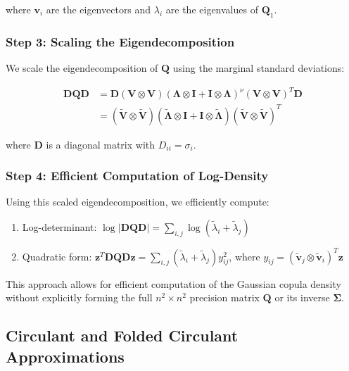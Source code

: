 \documentclass[journal=,manuscript=]{achemso}
\begin{document}
where \(\mathbf{v}_i\) are the eigenvectors and \(\lambda_i\) are the
eigenvalues of \(\mathbf{Q}_1\).

\subsubsection{Step 3: Scaling the
Eigendecomposition}\label{step-3-scaling-the-eigendecomposition}

We scale the eigendecomposition of \(\mathbf{Q}\) using the marginal
standard deviations:

\[
\begin{aligned}
\mathbf{D}\mathbf{Q}\mathbf{D} &= \mathbf{D}(\mathbf{V} \otimes \mathbf{V})(\mathbf{\Lambda} \otimes \mathbf{I} + \mathbf{I} \otimes \mathbf{\Lambda})^\nu(\mathbf{V} \otimes \mathbf{V})^T\mathbf{D} \\
&= (\mathbf{\tilde V} \otimes \mathbf{\tilde V})(\mathbf{\tilde\Lambda} \otimes \mathbf{I} + \mathbf{I} \otimes \mathbf{\tilde \Lambda})(\mathbf{\tilde V} \otimes \mathbf{\tilde V})^T
\end{aligned}
\]

where \(\mathbf{D}\) is a diagonal matrix with \(D_{ii} = \sigma_i\).

\subsubsection{Step 4: Efficient Computation of
Log-Density}\label{step-4-efficient-computation-of-log-density}

Using this scaled eigendecomposition, we efficiently compute:

\begin{enumerate}
\def\labelenumi{\arabic{enumi}.}
\item
  Log-determinant:
  \(\log|\mathbf{D}\mathbf{Q}\mathbf{D}| = \sum_{i,j} \log(\tilde\lambda_i + \tilde\lambda_j)\)
\item
  Quadratic form:
  \(\mathbf{z}^T\mathbf{D}\mathbf{Q}\mathbf{D}\mathbf{z} = \sum_{i,j} (\tilde\lambda_i + \tilde\lambda_j) y_{ij}^2\),
  where
  \(y_{ij} = (\mathbf{\tilde v}_j \otimes \mathbf{\tilde v}_i)^T\mathbf{z}\)
\end{enumerate}

This approach allows for efficient computation of the Gaussian copula
density without explicitly forming the full \(n^2 \times n^2\) precision
matrix \(\mathbf{Q}\) or its inverse \(\mathbf{\Sigma}\).

\subsection{Circulant and Folded Circulant
Approximations}\label{circulant-and-folded-circulant-approximations}
\end{document}
